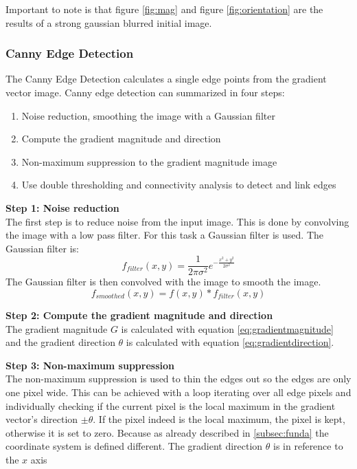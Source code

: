     Important to note is that figure \ref{fig:mag} and figure \ref{fig:orientation} are the results of a strong gaussian blurred initial image. 
    \subsubsection{Canny Edge Detection } 
    The Canny Edge Detection \cite{gonzalez_canny_nodate} calculates a single edge points from the gradient vector image.  
    Canny edge detection can summarized in four steps: 
    \begin{enumerate}
        \item Noise reduction, smoothing the image with a Gaussian filter
        \item Compute the gradient magnitude and direction
        \item Non-maximum suppression to the gradient magnitude image
        \item Use double thresholding and connectivity analysis to detect and link edges
    \end{enumerate}
\textbf{Step 1: Noise reduction} \\
The first step is to reduce noise from the input image. This is done by convolving the image with a low pass filter. For this task a Gaussian filter is used. The Gaussian filter is:
\begin{equation}
    f_{filter}(x,y) = \frac{1}{2\pi\sigma^2}e^{-\frac{x^2+y^2}{2\sigma^2}}
\end{equation}
The Gaussian filter is then convolved with the image to smooth the image. 
\begin{equation}
    f_{smoothed}(x,y) = f(x,y) * f_{filter}(x,y)
\end{equation} 

\textbf{Step 2: Compute the gradient magnitude and direction} \\
The gradient magnitude $G$ is calculated with equation \ref{eq:gradientmagnitude} and the gradient direction $\theta$ is calculated with equation \ref{eq:gradientdirection}.

\textbf{Step 3: Non-maximum suppression} \\
The non-maximum suppression is used to thin the edges out so the edges are only one pixel wide. This can be achieved with a loop iterating over all edge pixels and individually checking if the current pixel is the local maximum in the gradient vector's direction $\pm \theta$. If the pixel indeed is the local maximum, the pixel is kept, otherwise it is set to zero. Because as already described in \ref{subsec:funda} the coordinate system is defined different. The gradient direction $\theta$ is in reference to the $x$ axis

